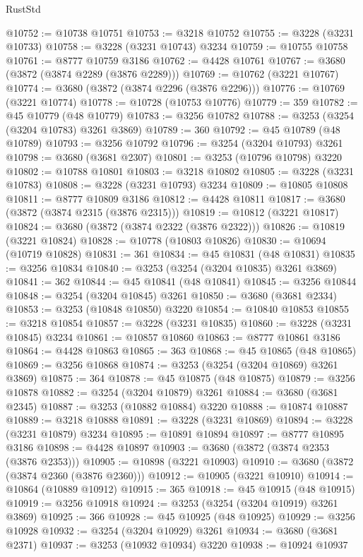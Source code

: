\begin{lexlean}{RustStd}
\begin{coremodule}
@10752 := @10738 @10751
@10753 := @3218 @10752
@10755 := @3228 (@3231 @10733)
@10758 := @3228 (@3231 @10743) @3234
@10759 := @10755 @10758
@10761 := @8777 @10759 @3186
@10762 := @4428 @10761
@10767 := @3680 (@3872 (@3874 @2289 (@3876 @2289)))
@10769 := @10762 (@3221 @10767)
@10774 := @3680 (@3872 (@3874 @2296 (@3876 @2296)))
@10776 := @10769 (@3221 @10774)
@10778 := @10728 (@10753 @10776)
@10779 := 359
@10782 := @45 @10779 (@48 @10779)
@10783 := @3256 @10782
@10788 := @3253 (@3254 (@3204 @10783) @3261 @3869)
@10789 := 360
@10792 := @45 @10789 (@48 @10789)
@10793 := @3256 @10792
@10796 := @3254 (@3204 @10793) @3261
@10798 := @3680 (@3681 @2307)
@10801 := @3253 (@10796 @10798) @3220
@10802 := @10788 @10801
@10803 := @3218 @10802
@10805 := @3228 (@3231 @10783)
@10808 := @3228 (@3231 @10793) @3234
@10809 := @10805 @10808
@10811 := @8777 @10809 @3186
@10812 := @4428 @10811
@10817 := @3680 (@3872 (@3874 @2315 (@3876 @2315)))
@10819 := @10812 (@3221 @10817)
@10824 := @3680 (@3872 (@3874 @2322 (@3876 @2322)))
@10826 := @10819 (@3221 @10824)
@10828 := @10778 (@10803 @10826)
@10830 := @10694 (@10719 @10828)
@10831 := 361
@10834 := @45 @10831 (@48 @10831)
@10835 := @3256 @10834
@10840 := @3253 (@3254 (@3204 @10835) @3261 @3869)
@10841 := 362
@10844 := @45 @10841 (@48 @10841)
@10845 := @3256 @10844
@10848 := @3254 (@3204 @10845) @3261
@10850 := @3680 (@3681 @2334)
@10853 := @3253 (@10848 @10850) @3220
@10854 := @10840 @10853
@10855 := @3218 @10854
@10857 := @3228 (@3231 @10835)
@10860 := @3228 (@3231 @10845) @3234
@10861 := @10857 @10860
@10863 := @8777 @10861 @3186
@10864 := @4428 @10863
@10865 := 363
@10868 := @45 @10865 (@48 @10865)
@10869 := @3256 @10868
@10874 := @3253 (@3254 (@3204 @10869) @3261 @3869)
@10875 := 364
@10878 := @45 @10875 (@48 @10875)
@10879 := @3256 @10878
@10882 := @3254 (@3204 @10879) @3261
@10884 := @3680 (@3681 @2345)
@10887 := @3253 (@10882 @10884) @3220
@10888 := @10874 @10887
@10889 := @3218 @10888
@10891 := @3228 (@3231 @10869)
@10894 := @3228 (@3231 @10879) @3234
@10895 := @10891 @10894
@10897 := @8777 @10895 @3186
@10898 := @4428 @10897
@10903 := @3680 (@3872 (@3874 @2353 (@3876 @2353)))
@10905 := @10898 (@3221 @10903)
@10910 := @3680 (@3872 (@3874 @2360 (@3876 @2360)))
@10912 := @10905 (@3221 @10910)
@10914 := @10864 (@10889 @10912)
@10915 := 365
@10918 := @45 @10915 (@48 @10915)
@10919 := @3256 @10918
@10924 := @3253 (@3254 (@3204 @10919) @3261 @3869)
@10925 := 366
@10928 := @45 @10925 (@48 @10925)
@10929 := @3256 @10928
@10932 := @3254 (@3204 @10929) @3261
@10934 := @3680 (@3681 @2371)
@10937 := @3253 (@10932 @10934) @3220
@10938 := @10924 @10937

\end{coremodule}
\end{lexlean}
